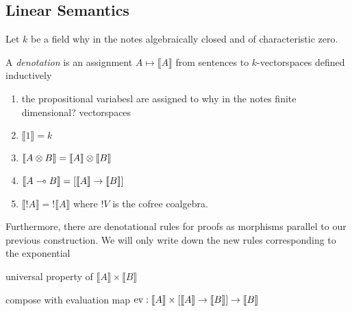 \documentclass[12pt]{article}
\newcommand{\br}[1]{\llbracket #1 \rrbracket}
\begin{document}
\subsection{Linear Semantics}

Let $k$ be a field {\color{red} why in the notes algebraically closed and of characteristic zero}. 

\begin{defn}
A \textit{denotation} is an assignment $A \mapsto \br{A}$ from sentences to $k$-vectorspaces defined inductively
\begin{enumerate}
\item the propositional variabesl are assigned to {\color{red} why in the notes finite dimensional?} vectorspaces
\item $\br{1} = k$
\item $\br{A \ot B} = \br{A} \ot \br{B}$
\item $\br{A \oto B} = [\br{A} \to \br{B}]$
\item $\br{!A} = ! \br{A}$ where $!V$ is the cofree coalgebra.
\end{enumerate}
Furthermore, there are denotational rules for proofs as morphisms parallel to our previous construction. We will only write down the new rules corresponding to the exponential
\begin{center}
\begin{minipage}{0.45\textwidth}
\begin{prooftree}
\end{prooftree}
\begin{center}
universal property of $\br{A} \times \br{B}$
\end{center}
\begin{prooftree}
\end{prooftree}
\begin{center}
compose with evaluation map $\ev : \br{A} \times [\br{A} \to \br{B}] \to \br{B}$
\end{center}
\end{minipage}
\end{center}
\end{defn}

\newcommand{\Sym}[1]{\mathrm{Sym}\left( #1 \right)}
\newcommand{\ket}[1]{\left| #1 \right>}
\end{document}
